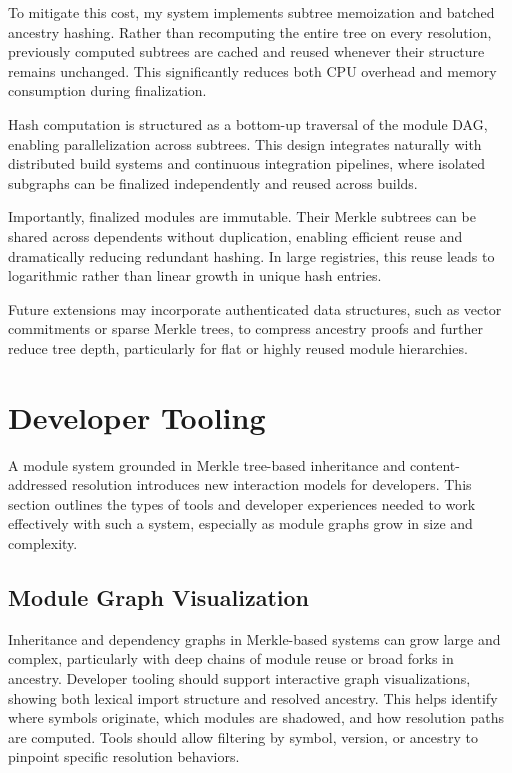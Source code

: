 \documentclass[sigplan,screen]{acmart}
\begin{document}
To mitigate this cost, my system implements subtree memoization and batched ancestry hashing. Rather than recomputing the entire tree on every resolution, previously computed subtrees are cached and reused whenever their structure remains unchanged. This significantly reduces both CPU overhead and memory consumption during finalization.

Hash computation is structured as a bottom-up traversal of the module DAG, enabling parallelization across subtrees. This design integrates naturally with distri\-buted build systems and continuous integration pipe\-lines, where isolated subgraphs can be finalized independently and reused across builds.

Importantly, finalized modules are immutable. Their Merkle subtrees can be shared across dependents without duplication, enabling efficient reuse and dramatically reducing redundant hashing. In large registries, this reuse leads to logarithmic rather than linear growth in unique hash entries.

Future extensions may incorporate authenticated data structures, such as vector commitments or sparse Merkle trees, to compress ancestry proofs and further reduce tree depth, particularly for flat or highly reused module hierarchies.

\section{Developer Tooling}
\label{sec:developer-tooling}

A module system grounded in Merkle tree-based inheritance and content-addressed resolution introduces new interaction models for developers. This section outlines the types of tools and developer experiences needed to work effectively with such a system, especially as module graphs grow in size and complexity.

\subsection{Module Graph Visualization}

Inheritance and dependency graphs in Merkle-based systems can grow large and complex, particularly with deep chains of module reuse or broad forks in ancestry. Developer tooling should support interactive graph visualizations, showing both lexical import structure and resolved ancestry. This helps identify where symbols originate, which modules are shadowed, and how resolution paths are computed. Tools should allow filtering by symbol, version, or ancestry to pinpoint specific resolution behaviors.
\end{document}
